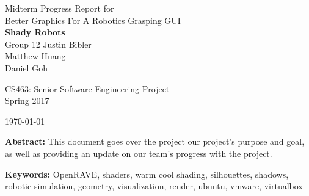 \documentclass[10pt,journal,compsoc,draftclsnofoot]{IEEEtran}
\begin{document}
\onecolumn

\begin{titlepage}
\null
\vspace{15mm}

\begin{flushleft}
\begin{bfseries}
	\vskip2mm
	\Huge{Midterm Progress Report for\\ Better Graphics For A Robotics Grasping GUI}\\
	\vspace{15mm}
	\textbf{\huge Shady Robots} \\
	\vskip2mm
	\large{Group 12}
	\vskip5mm
	\Large{Justin Bibler \\
	Matthew Huang \\
	Daniel Goh \\}
\end{bfseries}

\vspace{15mm}
\Large{CS463: Senior Software Engineering Project} \\
\Large{Spring 2017} \\

\vspace{5mm}

\today

\vfill

\begin{normalsize}
{\bf Abstract:}
This document goes over the project our project's purpose and goal, as well as providing an update on our team's progress with the project.

{\bf Keywords:} OpenRAVE, shaders, warm cool shading, silhouettes, shadows, robotic simulation, geometry, visualization, render, ubuntu, vmware, virtualbox
\end{normalsize}
\end{flushleft}

\newpage

\end{titlepage}
\end{document}
